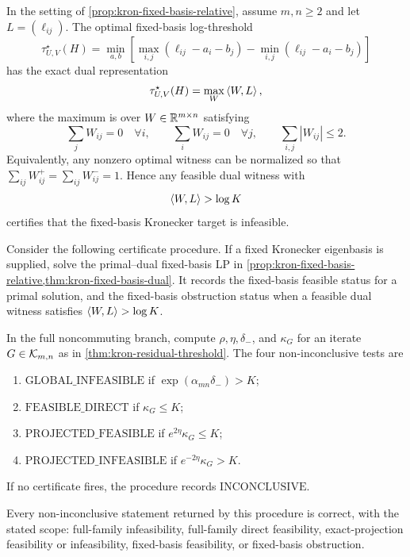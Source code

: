 \begin{theorem}
\label{thm:kron-fixed-basis-dual}
In the setting of \cref{prop:kron-fixed-basis-relative}, assume \(m,n\ge2\) and
let \(L=(\ell_{ij})\). The optimal fixed-basis log-threshold
\[
  \tau^\star_{U,V}(H)
  =
  \min_{a,b}
  \left[
  \max_{i,j}(\ell_{ij}-a_i-b_j)
  -
  \min_{i,j}(\ell_{ij}-a_i-b_j)
  \right]
\]
has the exact dual representation
\[
  \tau^\star_{U,V}(H)
  =
  \max_W \left\langle W,L\right\rangle,
\]
where the maximum is over \(W\in\mathbb R^{m\times n}\) satisfying
\[
  \sum_j W_{ij}=0\quad\forall i,\qquad
  \sum_i W_{ij}=0\quad\forall j,\qquad
  \sum_{i,j}|W_{ij}|\le2.
\]
Equivalently, any nonzero optimal witness can be normalized so that
\(\sum_{ij}W_{ij}^+=\sum_{ij}W_{ij}^-=1\). Hence any feasible dual witness
with
\[
  \left\langle W,L\right\rangle>\log K
\]
certifies that the fixed-basis Kronecker target is infeasible.
\end{theorem}

\begin{theorem}
\label{thm:kron-certify-soundness}
Consider the following certificate procedure. If a fixed Kronecker eigenbasis
is supplied, solve the primal--dual fixed-basis LP in
\cref{prop:kron-fixed-basis-relative,thm:kron-fixed-basis-dual}.  It records
the fixed-basis feasible status for a primal solution, and the fixed-basis
obstruction status when a feasible dual witness satisfies
\(\left\langle W,L\right\rangle>\log K\).

In the full noncommuting branch, compute \(\rho,\eta,\delta_-\), and
\(\kappa_G\) for an iterate \(G\in\mathcal K_{m,n}\) as in
\cref{thm:kron-residual-threshold}.  The four non-inconclusive tests are
\begin{enumerate}[leftmargin=*,itemsep=0.1em]
  \item \(\mathrm{GLOBAL\_INFEASIBLE}\) if
  \(\exp(\alpha_{mn}\delta_-)>K\);
  \item \(\mathrm{FEASIBLE\_DIRECT}\) if \(\kappa_G\le K\);
  \item \(\mathrm{PROJECTED\_FEASIBLE}\) if
  \(e^{2\eta}\kappa_G\le K\);
  \item \(\mathrm{PROJECTED\_INFEASIBLE}\) if
  \(e^{-2\eta}\kappa_G>K\).
\end{enumerate}
If no certificate fires, the procedure records \(\mathrm{INCONCLUSIVE}\).

Every non-inconclusive statement returned by this procedure is correct, with
the stated scope: full-family infeasibility, full-family direct feasibility,
exact-projection feasibility or infeasibility, fixed-basis feasibility, or
fixed-basis obstruction.
\end{theorem}

